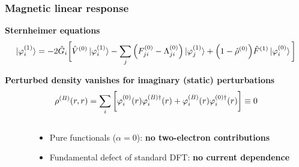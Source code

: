 \begin{frame}
\frametitle{Magnetic linear response}
\centering
\textbf{Sternheimer equations}
\begin{equation}
    \nonumber
    \ket{\varphi_i^{(1)}} = -2\hat{G}_i\bigg[
    \hat{V}^{(0)}\ket{\varphi_i^{(1)}} -
    \sum_j \Big(F^{(0)}_{ji} - \Lambda^{(0)}_{ji}\Big)
    \ket{\varphi_j^{(1)}} +
    \Big(1 - \hat{\rho}^{(0)}\Big)
    \hat{F}^{(1)}\ket{\varphi_i^{(0)}}
    \bigg]
\end{equation}

\vspace{5mm}



\vspace{5mm}

\textbf{Perturbed density vanishes for imaginary (static) perturbations}
\begin{equation}
    \nonumber
    \rho^{(B)}(r,r) = \sum_i 
    \bigg[
    \varphi_i^{(0)}(r)\varphi_i^{(B)\dagger}(r) +
    \varphi_i^{(B)}(r)\varphi_i^{(0)\dagger}(r)
    \bigg]
    \equiv 0
\end{equation}

\vspace{5mm}

\pause
\begin{columns}
\begin{column}[b]{0.05\linewidth}
\end{column}
\begin{column}[b]{0.95\linewidth}
\begin{itemize}
    \item   Pure functionals ($\alpha=0$): \textbf{no two-electron contributions}
    \item   Fundamental defect of standard DFT: \textbf{no current dependence}
\end{itemize}
\end{column}
\end{columns}
\end{frame}

